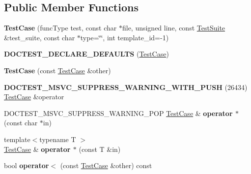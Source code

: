 \subsection*{Public Member Functions}
\begin{DoxyCompactItemize}
\item 
\mbox{\label{structdoctest_1_1detail_1_1_test_case_a589d99e8322a4d830d5173545cd3dabe}} 
{\bfseries Test\+Case} (func\+Type test, const char $\ast$file, unsigned line, const \mbox{\hyperlink{structdoctest_1_1detail_1_1_test_suite}{Test\+Suite}} \&test\+\_\+suite, const char $\ast$type=\char`\"{}\char`\"{}, int template\+\_\+id=-\/1)
\item 
\mbox{\label{structdoctest_1_1detail_1_1_test_case_a4c91340e4a29f234dbe11def30545212}} 
{\bfseries D\+O\+C\+T\+E\+S\+T\+\_\+\+D\+E\+C\+L\+A\+R\+E\+\_\+\+D\+E\+F\+A\+U\+L\+TS} (\mbox{\hyperlink{structdoctest_1_1detail_1_1_test_case}{Test\+Case}})
\item 
\mbox{\label{structdoctest_1_1detail_1_1_test_case_a0d8aa1f3d0cbd31f3bc4a74d9c6add23}} 
{\bfseries Test\+Case} (const \mbox{\hyperlink{structdoctest_1_1detail_1_1_test_case}{Test\+Case}} \&other)
\item 
\mbox{\label{structdoctest_1_1detail_1_1_test_case_a3e767f89d496f2dc80ebbab72677c754}} 
{\bfseries D\+O\+C\+T\+E\+S\+T\+\_\+\+M\+S\+V\+C\+\_\+\+S\+U\+P\+P\+R\+E\+S\+S\+\_\+\+W\+A\+R\+N\+I\+N\+G\+\_\+\+W\+I\+T\+H\+\_\+\+P\+U\+SH} (26434) \mbox{\hyperlink{structdoctest_1_1detail_1_1_test_case}{Test\+Case}} \&operator
\item 
\mbox{\label{structdoctest_1_1detail_1_1_test_case_a00eed9f78f661df1deb3d2005c48a10b}} 
D\+O\+C\+T\+E\+S\+T\+\_\+\+M\+S\+V\+C\+\_\+\+S\+U\+P\+P\+R\+E\+S\+S\+\_\+\+W\+A\+R\+N\+I\+N\+G\+\_\+\+P\+OP \mbox{\hyperlink{structdoctest_1_1detail_1_1_test_case}{Test\+Case}} \& {\bfseries operator $\ast$} (const char $\ast$in)
\item 
\mbox{\label{structdoctest_1_1detail_1_1_test_case_aef5a398befcb64564e3d371ccabc1285}} 
{\footnotesize template$<$typename T $>$ }\\\mbox{\hyperlink{structdoctest_1_1detail_1_1_test_case}{Test\+Case}} \& {\bfseries operator $\ast$} (const T \&in)
\item 
\mbox{\label{structdoctest_1_1detail_1_1_test_case_a865f5906758263125b68b8d785a05ca1}} 
bool {\bfseries operator$<$} (const \mbox{\hyperlink{structdoctest_1_1detail_1_1_test_case}{Test\+Case}} \&other) const
\end{DoxyCompactItemize}

